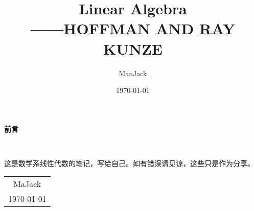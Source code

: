 \documentclass[11pt, a4paper, oneside,UTF8]{ctexbook}
\title{{\Huge{\textbf{Linear Algebra}}}\\------HOFFMAN AND RAY KUNZE}
\author{ManJack}
\date{\today}
\newtheorem[M]{theorem}{Theorem}[section]
\newtheorem[M]{lemma}[theorem]{Lemma}
\newtheorem[M]{proposition}[theorem]{Proposition}
\newtheorem[M]{corollary}[theorem]{Corollary}
\newtheorem[M]{definition}{Definition}[section]
\begin{document}
\maketitle

\setcounter{page}{1}
\newpage
\begin{center}
	\Huge\textbf{前言}
\end{center}~\

这是数学系线性代数的笔记，写给自己。如有错误请见谅，这些只是作为分享。
~
\begin{flushright}
	\begin{tabular}{c}
		MaJack \\
		\today
	\end{tabular}
\end{flushright}

\newpage
{}
\setcounter{page}{1}

\tableofcontents
\newpage
\setcounter{page}{1}




\end{document}

